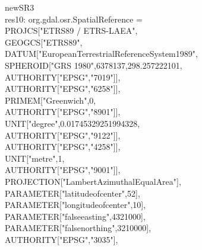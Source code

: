 \documentclass {article}
\begin{document}
newSR3\\
res10: org.gdal.osr.SpatialReference =\\
PROJCS["ETRS89 / ETRS-LAEA",\\
\hspace*{2mm} GEOGCS["ETRS89",\\
\hspace*{4mm} DATUM["European\underline{\space}Terrestrial\underline{\space}Reference\underline{\space}System\underline{\space}1989",\\
\hspace*{6mm} SPHEROID["GRS 1980",6378137,298.257222101,\\
\hspace*{8mm} AUTHORITY["EPSG","7019"]],\\
\hspace*{6mm} AUTHORITY["EPSG","6258"]],\\
\hspace*{4mm} PRIMEM["Greenwich",0,\\
\hspace*{6mm} AUTHORITY["EPSG","8901"]],\\
\hspace*{4mm} UNIT["degree",0.01745329251994328,\\
\hspace*{6mm} AUTHORITY["EPSG","9122"]],\\
\hspace*{4mm} AUTHORITY["EPSG","4258"]],\\
\hspace*{2mm} UNIT["metre",1,\\
\hspace*{4mm} AUTHORITY["EPSG","9001"]],\\
\hspace*{2mm} PROJECTION["Lambert\underline{\space}Azimuthal\underline{\space}Equal\underline{\space}Area"],\\
\hspace*{2mm} PARAMETER["latitude\underline{\space}of\underline{\space}center",52],\\
\hspace*{2mm} PARAMETER["longitude\underline{\space}of\underline{\space}center",10],\\
\hspace*{2mm} PARAMETER["false\underline{\space}easting",4321000],\\
\hspace*{2mm} PARAMETER["false\underline{\space}northing",3210000],\\
\hspace*{2mm} AUTHORITY["EPSG","3035"],\\
\end{document}
